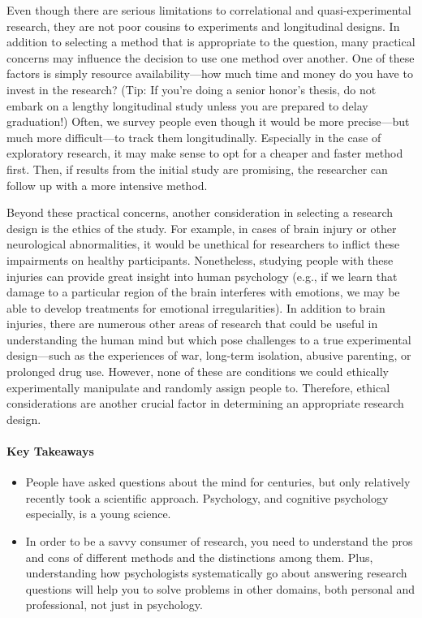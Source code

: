 \documentclass[
]{krantz}
\providecommand{\tightlist}{%
  \setlength{\itemsep}{0pt}\setlength{\parskip}{0pt}}
\begin{document}
Even though there are serious limitations to correlational and quasi-experimental research, they are not poor cousins to experiments and longitudinal designs. In addition to selecting a method that is appropriate to the question, many practical concerns may influence the decision to use one method over another. One of these factors is simply resource availability---how much time and money do you have to invest in the research? (Tip: If you're doing a senior honor's thesis, do not embark on a lengthy longitudinal study unless you are prepared to delay graduation!) Often, we survey people even though it would be more precise---but much more difficult---to track them longitudinally. Especially in the case of exploratory research, it may make sense to opt for a cheaper and faster method first. Then, if results from the initial study are promising, the researcher can follow up with a more intensive method.

Beyond these practical concerns, another consideration in selecting a research design is the ethics of the study. For example, in cases of brain injury or other neurological abnormalities, it would be unethical for researchers to inflict these impairments on healthy participants. Nonetheless, studying people with these injuries can provide great insight into human psychology (e.g., if we learn that damage to a particular region of the brain interferes with emotions, we may be able to develop treatments for emotional irregularities). In addition to brain injuries, there are numerous other areas of research that could be useful in understanding the human mind but which pose challenges to a true experimental design---such as the experiences of war, long-term isolation, abusive parenting, or prolonged drug use. However, none of these are conditions we could ethically experimentally manipulate and randomly assign people to. Therefore, ethical considerations are another crucial factor in determining an appropriate research design.

\paragraph*{Key Takeaways}\label{key-takeaways}

\begin{itemize}
\tightlist
\item
  People have asked questions about the mind for centuries, but only relatively recently took a scientific approach. Psychology, and cognitive psychology especially, is a young science.
\item
  In order to be a savvy consumer of research, you need to understand the pros and cons of different methods and the distinctions among them. Plus, understanding how psychologists systematically go about answering research questions will help you to solve problems in other domains, both personal and professional, not just in psychology.
\end{itemize}
\end{document}
